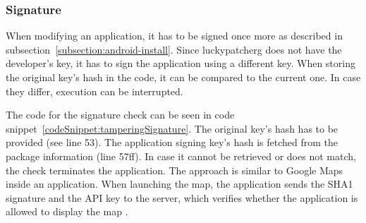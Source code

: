 \subsubsection{Signature} \label{subsection:counter-improve-tampering-signature}
When modifying an application, it has to be signed once more as described in subsection~\ref{subsection:android-install}.
Since \gls{luckypatcherg} does not have the developer’s key, it has to sign the application using a different key.
\newline
When storing the original key’s hash in the code, it can be compared to the current one.
In case they differ, execution can be interrupted.
\newpage

The code for the signature check can be seen in code snippet~\ref{codeSnippet:tamperingSignature}.
The original key’s hash has to be provided (see line 53).
The application signing key’s hash is fetched from the package information (line 57ff).
In case it cannot be retrieved or does not match, the check terminates the application.
\newline
The approach is similar to Google Maps inside an application.
When launching the map, the application sends the SHA1 signature and the API key to the server, which verifies whether the application is allowed to display the map \cite{maps}.

